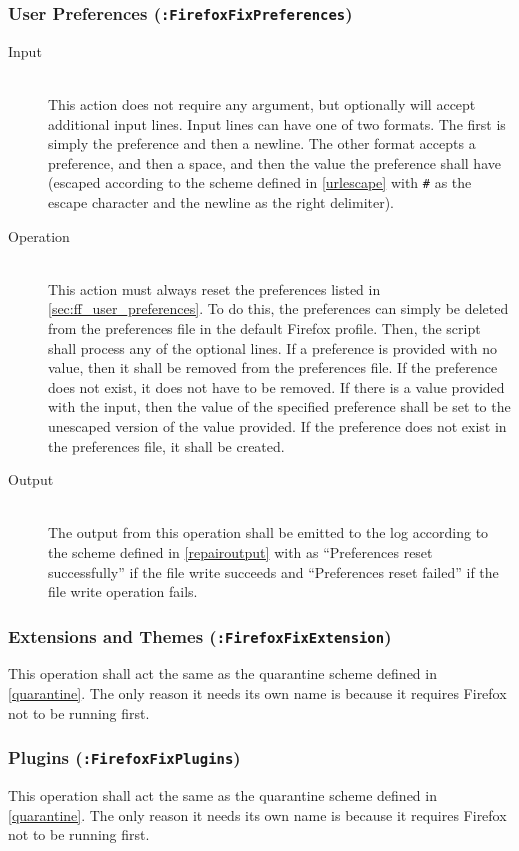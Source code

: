 \subsubsection{User Preferences (\texttt{:FirefoxFixPreferences})}
\begin{description}
\item[Input] \hfill \\
This action does not require any argument, but optionally will accept additional
input lines.  Input lines can have one of two formats.  The first is simply the
preference and then a newline.  The other format accepts a preference, and then
a space, and then the value the preference shall have (escaped according to
the scheme defined in \ref{urlescape} with \verb|#| as the escape character and
the newline as the right delimiter). 
\item[Operation] \hfill \\
This action must always reset the preferences listed in
\ref{sec:ff_user_preferences}.  To do this, the preferences can simply be
deleted from the preferences file in the default Firefox profile.  Then, the
script shall process any of the optional lines.  If a preference is provided
with no value, then it shall be removed from the preferences file.  If the
preference does not exist, it does not have to be removed.  If there is a value
provided with the input, then the value of the specified preference shall be
set to the unescaped version of the value provided.  If the preference does not
exist in the preferences file, it shall be created.
\item[Output] \hfill \\
The output from this operation shall be emitted to the log according to the
scheme defined in \ref{repairoutput} with  as ``Preferences reset
successfully'' if the file write succeeds and ``Preferences reset failed'' if
the file write operation fails.
\end{description}

\subsubsection{Extensions and Themes (\texttt{:FirefoxFixExtension})}
This operation shall act the same as the quarantine scheme
defined in \ref{quarantine}. The only reason it needs its own name is because it
requires Firefox not to be running first.

\subsubsection{Plugins (\texttt{:FirefoxFixPlugins})}
This operation shall act the same as the quarantine scheme
defined in \ref{quarantine}. The only reason it needs its own name is because it
requires Firefox not to be running first.

